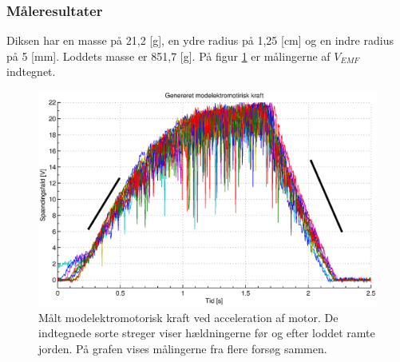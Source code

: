 \subsubsection{Måleresultater}
Diksen har en masse på 21,2 [g], en ydre radius på 1,25 [cm] og en indre radius på 5 [mm].
Loddets masse er 851,7 [g].
På figur \ref{fig:vemf0} er målingerne af \(V_{EMF}\) indtegnet.

\begin{figure}[th!]
	\centering
	\includegraphics[width=1\textwidth]{./graphics/vemf0.eps}
	\caption[Målt modelektromotorisk kraft ved acceleration af motor]
		{Målt modelektromotorisk kraft ved acceleration af motor.
		De indtegnede sorte streger viser hældningerne før og efter loddet ramte jorden.
		På grafen vises målingerne fra flere forsøg sammen.}
	\label{fig:vemf0}
\end{figure}
